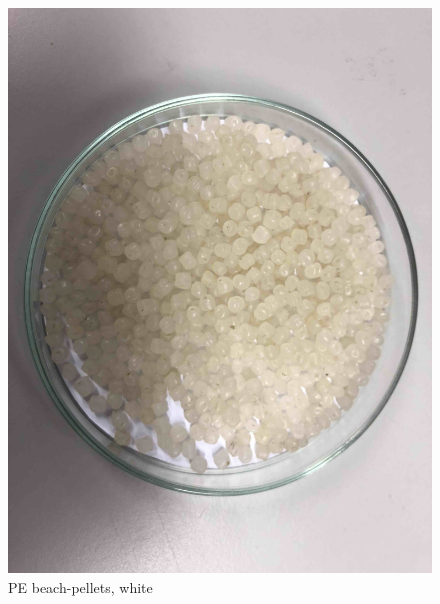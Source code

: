 \begin{appendices}
\begin{figure}
    \centering
    \includegraphics[width = 12cm]{Images/appendix/PE-pellets-beached-texel-white.jpg}
    \caption{PE beach-pellets, white}
    \label{fig:pe_beach_w}
\end{figure}


\end{appendices}
